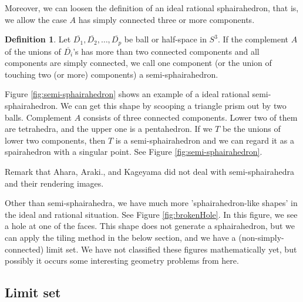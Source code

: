 \documentclass[suppldata, dvipdfmx]{interact}
\theoremstyle{plain}%
\theoremstyle{definition}
\newtheorem{definition}[theorem]{Definition}
\theoremstyle{remark}
\theoremstyle{problemstyle}
\begin{document}
Moreover, we can loosen the definition of an ideal rational sphairahedron, 
that is, we allow the case $A$ has simply connected three or more components.

\begin{definition}
Let $\overline{D_1}, \overline{D_2},\ldots, \overline{D_p}$ be ball or
half-space in $S^3$.  If the complement $A$ of the unions of
$\overline{D_i}$'s has more than two connected components and all
components are simply connected, we call one component (or the union of
touching two (or more) components) a semi-sphairahedron.
\end{definition}
Figure \ref{fig:semi-sphairahedron} shows an
example of a ideal rational semi-sphairahedron.  We can get this shape by scooping a
triangle prism out by two balls.  Complement $A$ consists of three
connected components. Lower two of them are tetrahedra, and the upper 
one is a pentahedron.  If we $T$ be the unions of lower two components,  
then $T$ is a semi-sphairahedron and we can regard it as a spairahedron with a singular point.  See Figure \ref{fig:semi-sphairahedron}.


Remark that Ahara, Araki\cite{AharaAraki}.,
and Kageyama\cite{kageyama} did not deal with semi-sphairahedra and their rendering images.

Other than semi-sphairahedra, we have much more 'sphairahedron-like
shapes' in the ideal and rational situation.  See Figure \ref{fig:brokenHole}. In this
figure, we see a hole at one of the faces.  This shape does not generate a
sphairahedron, but we can apply the tiling method in the below section, 
and we have a (non-simply-connected) limit set.  We have not classified
these figures mathematically yet, but possibly it occurs some
interesting geometry problems from here.


\subsection{Limit set}\label{constructFractal}
\end{document}
